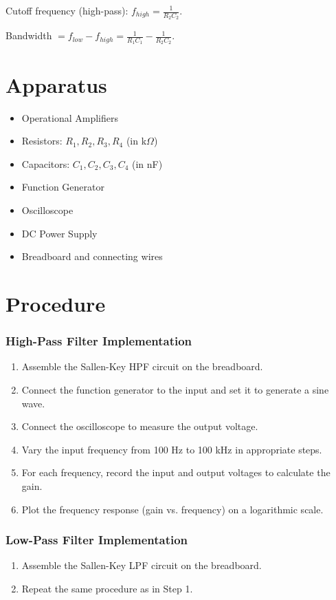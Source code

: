 \documentclass[12pt]{article}
\begin{document}
Cutoff frequency (high-pass): $ f_{high} = \frac{1}{R_2 C_2}$.\newline

Bandwidth $= f_{low} - f_{high} = \frac{1}{R_1 C_1} - \frac{1}{R_2 C_2}$.

\section{Apparatus}
\begin{itemize}
    \item Operational Amplifiers
    \item Resistors: $R_1, R_2, R_3, R_4$ (in k$\Omega$)
    \item Capacitors: $C_1, C_2, C_3, C_4$ (in nF)
    \item Function Generator
    \item Oscilloscope
    \item DC Power Supply
    \item Breadboard and connecting wires
\end{itemize}

\section{Procedure}
\subsubsection{High-Pass Filter Implementation}
\begin{enumerate}
    \item Assemble the Sallen-Key HPF circuit on the breadboard.
    \item Connect the function generator to the input and set it to generate a sine wave.
    \item Connect the oscilloscope to measure the output voltage.
    \item Vary the input frequency from 100 Hz to 100 kHz in appropriate steps.
    \item For each frequency, record the input and output voltages to calculate the gain.
    \item Plot the frequency response (gain vs. frequency) on a logarithmic scale.
\end{enumerate}

\subsubsection{Low-Pass Filter Implementation}
\begin{enumerate}
    \item Assemble the Sallen-Key LPF circuit on the breadboard.
    \item Repeat the same procedure as in Step 1.
\end{enumerate}
\end{document}
